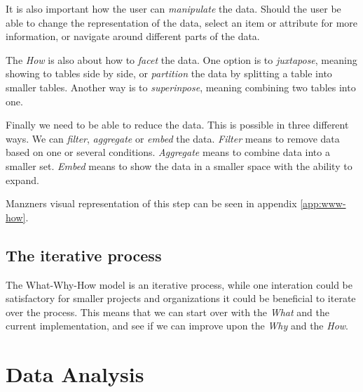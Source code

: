It is also important how the user can \textit{manipulate} the data. Should the user be able 
to change the representation of the data, select an item or attribute for more information, or 
navigate around different parts of the data. 

The \textit{How} is also about how to \textit{facet} the data. One option is to 
\textit{juxtapose}, meaning showing to tables side by side, or \textit{partition} the data by splitting
a table into smaller tables.
Another way is to \textit{superinpose}, meaning combining two tables into one.

Finally we need to be able to reduce the data. This is possible in three different ways.
We can \textit{filter}, \textit{aggregate} or \textit{embed} the data.
\textit{Filter} means to remove data based on one or several conditions. 
\textit{Aggregate} means to combine data into a smaller set.
\textit{Embed} means to show the data in a smaller space with the ability to expand.

Manzners visual representation of this step can be seen in appendix \ref{app:www-how}.

\subsection{The iterative process}

The What-Why-How model is an iterative process, while one interation could be satisfactory for 
smaller projects and organizations it could be beneficial to iterate over the process.
This means that we can start over with the \textit{What} and the current implementation, and 
see if we can improve upon the \textit{Why} and the \textit{How}.

\section{Data Analysis}\label{sec:DataAndAnalytics}